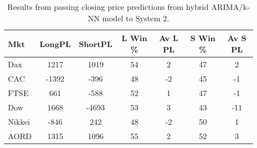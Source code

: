 \begin{table}[ht]
\centering
\caption[Results from passing closing price predictions from hybrid ARIMA/k-NN model to System 2]{Results from passing closing price predictions from hybrid ARIMA/k-NN model to System 2.} 
\label{tab:chp_ts:pred_close_arima_knn_sys2}
\begin{tabular}{lcccccc}
  \toprule Mkt & LongPL & ShortPL & L Win \% & Av L PL & S Win \% & Av S PL \\ 
  \midrule Dax & 1217 & 1019 & 54 & 2 & 47 & 2 \\ 
  CAC & -1392 & -396 & 48 & -2 & 45 & -1 \\ 
  FTSE & 661 & -588 & 52 & 1 & 47 & -1 \\ 
  Dow & 1668 & -4693 & 53 & 3 & 43 & -11 \\ 
  Nikkei & -846 & 242 & 48 & -2 & 50 & 1 \\ 
  AORD & 1315 & 1096 & 55 & 2 & 52 & 3 \\ 
   \bottomrule \end{tabular}
\end{table}
